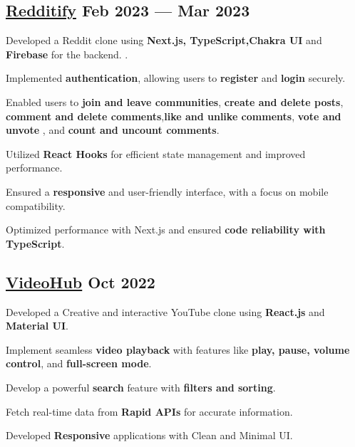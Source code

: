 
\subsection{{\href{https://reddit-clonee-app.vercel.app/}{Redditify} \hfill Feb 2023 --- Mar 2023}}
\begin{zitemize}
\item Developed a Reddit clone using \textbf{Next.js, TypeScript,Chakra UI} and \textbf{Firebase} for the backend. .
\item Implemented \textbf{authentication}, allowing users to \textbf{register} and \textbf{login} securely.
\item Enabled users to \textbf{join and leave communities}, \textbf{create and delete posts}, \textbf{comment and delete comments},\textbf{like and unlike comments},  \textbf{vote and unvote} , and  \textbf{count and uncount comments}.
\item Utilized \textbf{React Hooks} for efficient state management and improved performance.
\item Ensured a \textbf{responsive} and user-friendly interface, with a focus on mobile compatibility.
\item Optimized performance with Next.js and ensured \textbf{code reliability with TypeScript}.

\end{zitemize}


\subsection{{\href{https://youtubee.vercel.app/}{VideoHub} \hfill Oct 2022}}
\begin{zitemize}
\item Developed a Creative and interactive YouTube clone using \textbf{React.js} and \textbf{Material UI}.
\item  Implement seamless \textbf{video playback} with features like \textbf{play, pause, volume control}, and \textbf{full-screen mode}.
\item  Develop a powerful \textbf{search} feature with \textbf{filters and sorting}.
\item  Fetch real-time data from \textbf{Rapid APIs} for accurate information.
\item  Developed \textbf{Responsive} applications with Clean and Minimal UI.
\end{zitemize}

